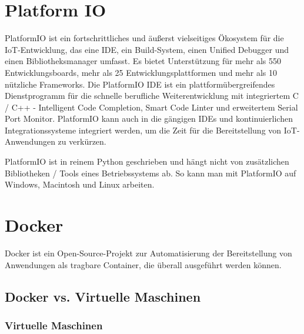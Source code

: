 
\section{Platform IO}\label{sec:platformio}

PlatformIO ist ein fortschrittliches und äußerst vielseitiges Ökosystem für die IoT-Entwicklung, das eine IDE, ein Build-System, einen Unified Debugger und einen Bibliotheksmanager umfasst. Es bietet Unterstützung für mehr als 550 Entwicklungsboards, mehr als 25 Entwicklungsplattformen und mehr als 10 nützliche Frameworks. Die PlatformIO IDE ist ein plattformübergreifendes Dienstprogramm für die schnelle berufliche Weiterentwicklung mit integriertem C / C++ - Intelligent Code Completion, Smart Code Linter und erweitertem Serial Port Monitor. PlatformIO kann auch in die gängigen IDEs und kontinuierlichen Integrationssysteme integriert werden, um die Zeit für die Bereitstellung von IoT-Anwendungen zu verkürzen.\cite{platformio_about_us}

PlatformIO ist in reinem Python geschrieben und hängt nicht von zusätzlichen Bibliotheken / Tools eines Betriebssystems ab. So kann man mit PlatformIO auf Windows, Macintosh und Linux arbeiten.

\section{Docker}\label{sec:docker}

Docker ist ein Open-Source-Projekt zur Automatisierung der Bereitstellung von Anwendungen als tragbare Container, die überall ausgeführt werden können. 

\subsection{Docker vs. Virtuelle Maschinen}\label{sec:docker-vm}

\subsubsection{Virtuelle Maschinen}

